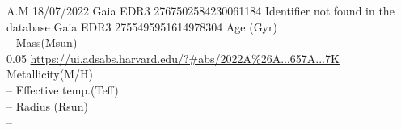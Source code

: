 A.M 18/07/2022
Gaia EDR3 2767502584230061184 Identifier not found in the database
Gaia EDR3 2755495951614978304
Age (Gyr)\\
--
Mass(Msun)\\
0.05 \url{https://ui.adsabs.harvard.edu/?#abs/2022A%26A...657A...7K}\\
Metallicity(M/H)\\
--
Effective temp.(Teff)\\
--
Radius (Rsun)\\
--